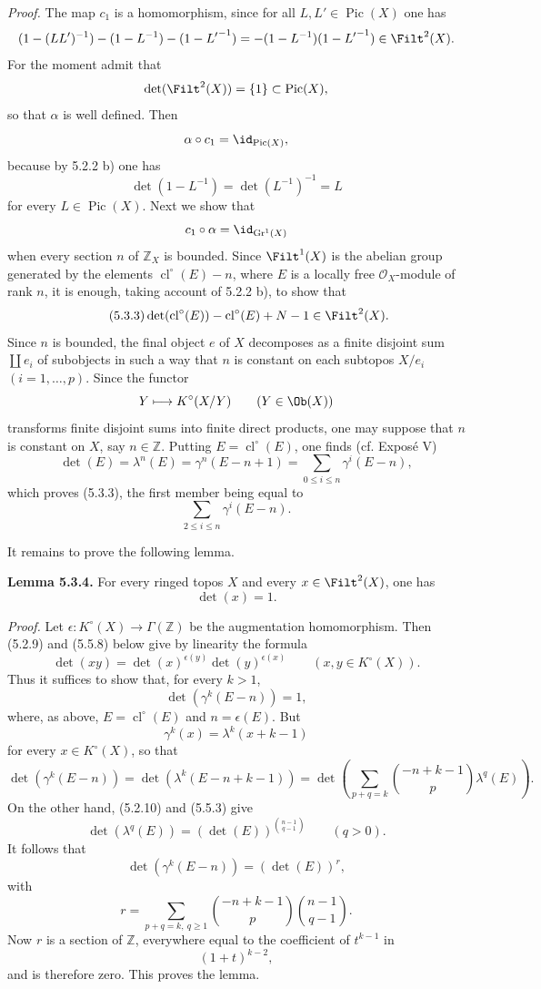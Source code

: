 \documentclass[11pt]{article}
\newcommand{\Gr}{\operatorname{Gr}}
\newcommand{\cl}{\operatorname{cl}}
\providecommand{\Pic}{\operatorname{Pic}}
\providecommand{\Gr}{\operatorname{Gr}}
\providecommand{\Gr}{\operatorname{G}}
\begin{document}
\emph{Proof.} The map \(c_1\) is a homomorphism, since for all \(L,L'\in\Pic(X)\) one has
\[
 (1-(LL')^{-1})-(1-L^{-1})-(1-{L'}^{-1})
 =
 -(1-L^{-1})(1-{L'}^{-1})\in\Filt^2(X).
\]
For the moment admit that
\[
 \det(\Filt^2(X))=\{1\}\subset\Pic(X),
\]
so that \(\alpha\) is well defined. Then
\[
 \alpha\circ c_1=\id_{\Pic(X)},
\]
because by 5.2.2 b) one has
\[
 \det(1-L^{-1})=\det(L^{-1})^{-1}=L
\]
for every \(L\in\Pic(X)\). Next we show that
\[
 c_1\circ\alpha=\id_{\Gr^1(X)}
\]
when every section \(n\) of \(\mathbb Z_X\) is bounded. Since \(\Filt^1(X)\) is the abelian group generated by the elements \(\cl^\circ(E)-n\), where \(E\) is a locally free \(\mathcal O_X\)-module of rank \(n\), it is enough, taking account of 5.2.2 b), to show that
\begin{equation}\tag{5.3.3}
 \det(\cl^\circ(E))-\cl^\circ(E)+N-1\in\Filt^2(X).
\end{equation}
Since \(n\) is bounded, the final object \(e\) of \(X\) decomposes as a finite disjoint sum \(\coprod e_i\) of subobjects in such a way that \(n\) is constant on each subtopos \(X/e_i\) \((i=1,\ldots,p)\). Since the functor
\[
 Y\longmapsto K^\circ(X/Y)\qquad(Y\in\Ob(X))
\]
transforms finite disjoint sums into finite direct products, one may suppose that \(n\) is constant on \(X\), say \(n\in\mathbb Z\). Putting \(E=\cl^\circ(E)\), one finds (cf. Exposé V)
\[
 \det(E)=\lambda^n(E)=\gamma^n(E-n+1)
 =
 \sum_{0\leq i\leq n}\gamma^i(E-n),
\]
which proves (5.3.3), the first member being equal to
\[
 \sum_{2\leq i\leq n}\gamma^i(E-n).
\]

It remains to prove the following lemma.

\textbf{Lemma 5.3.4.} For every ringed topos \(X\) and every \(x\in\Filt^2(X)\), one has
\[
 \det(x)=1.
\]

\emph{Proof.} Let \(\epsilon:K^\circ(X)\to\Gamma(\mathbb Z)\) be the augmentation homomorphism. Then (5.2.9) and (5.5.8) below give by linearity the formula
\begin{equation}\tag{5.3.5}
 \det(xy)=\det(x)^{\epsilon(y)}\det(y)^{\epsilon(x)}
 \qquad (x,y\in K^\circ(X)).
\end{equation}
Thus it suffices to show that, for every \(k>1\),
\[
 \det(\gamma^k(E-n))=1,
\]
where, as above, \(E=\cl^\circ(E)\) and \(n=\epsilon(E)\). But
\[
 \gamma^k(x)=\lambda^k(x+k-1)
\]
for every \(x\in K^\circ(X)\), so that
\[
 \det(\gamma^k(E-n))
 =
 \det(\lambda^k(E-n+k-1))
 =
 \det\left(\sum_{p+q=k}\binom{-n+k-1}{p}\lambda^q(E)\right).
\]
On the other hand, (5.2.10) and (5.5.3) give
\[
 \det(\lambda^q(E))=(\det(E))^{\binom{n-1}{q-1}}
 \qquad(q>0).
\]
It follows that
\[
 \det(\gamma^k(E-n))=(\det(E))^r,
\]
with
\[
 r=\sum_{p+q=k,\ q\geq1}\binom{-n+k-1}{p}\binom{n-1}{q-1}.
\]
Now \(r\) is a section of \(\mathbb Z\), everywhere equal to the coefficient of \(t^{k-1}\) in
\[
 (1+t)^{k-2},
\]
and is therefore zero. This proves the lemma.
\end{document}
